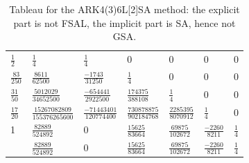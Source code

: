 \documentclass{article}
\begin{document}
\begin{table}[H]
{\begin{tabular}{l|l l l l l l}
             \vspace{0.15cm}
             $\frac{1}{2}$ & $\frac{1}{4}$ & $\frac{1}{4}$ & 0 &  0 & 0 & 0\\
            \vspace{0.15cm}
            $\frac{83}{250}$ & $\frac{8611}{62500}$ & $\frac{-1743}{31250}$ & $\frac{1}{4}$  & 0 & 0 & 0 \\
            \vspace{0.15cm}
            $\frac{31}{50}$ & $\frac{5012029}{34652500}$ & $\frac{-654441}{2922500}$ & $\frac{174375}{388108}$ & $\frac{1}{4}$ & 0 & 0  \\
            \vspace{0.15cm}
            $\frac{17}{20}$ & $\frac{15267082809}{155376265600}$ & $\frac{-71443401}{120774400}$ & $\frac{730878875}{902184768}$ & $\frac{2285395}{8070912}$ & $\frac{1}{4}$ & 0 \\
            \vspace{0.15cm}
            1 & $\frac{82889}{524892}$ & 0 & $\frac{15625}{83664}$ & $\frac{69875}{102672}$ & $\frac{-2260}{8211}$ & $\frac{1}{4}$\\
            \hline
             \vspace{0.15cm}
            &   $\frac{82889}{524892}$   &   0     &  $\frac{15625}{83664}$     &    $\frac{69875}{102672}$  &    $\frac{-2260}{8211}$ &    $\frac{1}{4}$  \\
        \end{tabular}%
    	} \\
    \vspace{0.2cm}
     \\
    \caption{Tableau for the ARK4(3)6L[2]SA method: the explicit part is not FSAL, the implicit part is SA, hence not GSA.}
    \label{tab:ARK436L2SA}
\end{table}

\end{document}
